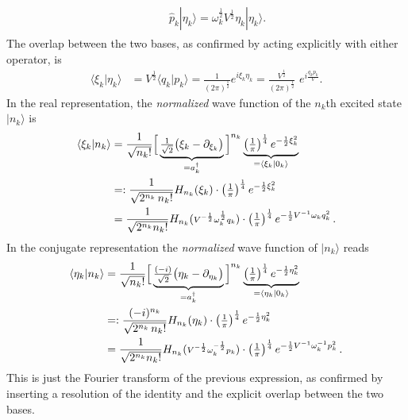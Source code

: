 \documentclass[../QFT_main.tex]{subfiles}
\begin{document}
\begin{mytheorem}
\begin{align}
\begin{aligned}
     \qquad
    \hat{p}_k | \eta_k \rangle = \omega_k^{\frac{1}{2}} V^{\frac{1}{2}} \eta_k | \eta_k \rangle.
\end{aligned}
\end{align}
%
The overlap between the two bases, as confirmed by acting explicitly with either operator, is
\begin{align}
    \langle \xi_k | \eta_k \rangle &= V^{\frac{1}{2}}\langle q_k | p_k \rangle = \frac{1}{(2\pi)^{\frac{1}{2}}}e^{i \xi_k\eta_k}= \frac{V^{\frac{1}{2}}}{(2\pi)^{\frac{1}{2}}}\,\,e^{i \frac{q_k p_k}{V}}.
\end{align}
In the real representation, the \emph{normalized} wave function of the $n_k$th excited state $|n_k\rangle$ is
\begin{align}
    \langle \xi_{k} | n_k \rangle 
     &= \frac{1}{\sqrt{n_k!}}\Big[\underbrace{\tfrac{1}{\sqrt{2}}\big(\xi_k-\partial_{\xi_k}\big)}_{=a^\dagger_k}\Big]^{n_k} \underbrace{\left( \tfrac{1}{\pi} \right)^{\frac{1}{4}} e^{-\frac{1}{2}\xi_k^2}}_{= \langle \xi_k | 0_k \rangle}
     \\
     &=:  \frac{1}{\sqrt{2^{n_k}\,n_k!}} H_{n_k}(\xi_k) \cdot \left( \tfrac{1}{\pi} \right)^{\frac{1}{4}} e^{-\frac{1}{2}\xi_k^2}
     \\
     &= \frac{1}{\sqrt{2^{n_k}n_k!}} H_{n_k}(\text{\scriptsize $V^{-\frac{1}{2}}\omega_k^{\frac{1}{2}}q_k$}) \cdot \left( \tfrac{1}{\pi} \right)^{\frac{1}{4}} e^{-\frac{1}{2}V^{-1} \omega_k q_k^2}\,.
\end{align}
In the conjugate representation the \emph{normalized} wave function of $|n_k\rangle$ reads
\begin{align}
    \langle \eta_{k} | n_k \rangle 
     &= \frac{1}{\sqrt{n_k!}}\Big[\underbrace{\tfrac{(-i)}{\sqrt{2}}\big(\eta_k-\partial_{\eta_k}\big)}_{=a^\dagger_k}\Big]^{n_k} \underbrace{\left(\tfrac{1}{\pi}\right)^{\frac{1}{4}} e^{-\frac{1}{2}\eta_k^2}}_{= \langle \eta_k | 0_k \rangle}
     \\
     &=: \frac{(-i)^{n_k}}{\sqrt{2^{n_k}\,n_k!}} H_{n_k}(\eta_k) \cdot \left(\tfrac{1}{\pi}\right)^{\frac{1}{4}} e^{-\frac{1}{2}\eta_k^2}
     \\
     &= \frac{1}{\sqrt{2^{n_k}n_k!}} H_{n_k}(\text{\scriptsize $V^{-\frac{1}{2}}\omega_k^{-\frac{1}{2}}p_k$}) \cdot \left( \tfrac{1}{\pi} \right)^{\frac{1}{4}} e^{-\frac{1}{2}V^{-1} \omega_k^{-1} p_k^2}\,.
\end{align}
%
This is just the Fourier transform of the previous expression, as confirmed by inserting a resolution of the identity and the explicit overlap between the two bases.

\end{mytheorem}
\end{document}
